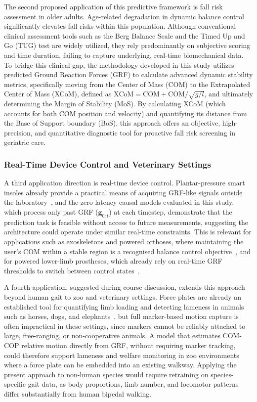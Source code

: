 \documentclass[preprint,12pt]{elsarticle}
\begin{document}
The second proposed application of this predictive framework is fall risk
assessment in older adults.
Age-related degradation in dynamic balance control significantly elevates fall
risks within this population.
Although conventional clinical assessment tools such as the Berg Balance Scale
and the Timed Up and Go (TUG) test are widely utilized, they rely predominantly
on subjective scoring and time duration, failing to capture underlying, real-time
biomechanical data.
To bridge this clinical gap, the methodology developed in this study utilizes
predicted Ground Reaction Forces (GRF) to calculate advanced dynamic stability
metrics, specifically moving from the Center of Mass (COM) to the Extrapolated
Center of Mass (XCoM), defined as $\mathrm{XCoM} = \mathrm{COM} + \dot{\mathrm{COM}} / \sqrt{g/l}$,
and ultimately determining the Margin of Stability (MoS).
By calculating XCoM (which accounts for both COM position and velocity) and
quantifying its distance from the Base of Support boundary (BoS), this approach
offers an objective, high-precision, and quantitative diagnostic tool for proactive
fall risk screening in geriatric care.

\subsubsection{Real-Time Device Control and Veterinary Settings}
\label{subsubsec:device}

A third application direction is real-time device control.
Plantar-pressure smart insoles already provide a practical means of acquiring
GRF-like signals outside the laboratory~\cite{s22249725}, and the zero-latency
causal models evaluated in this study, which process only past GRF
($\mathbf{g}_{0:t}$) at each timestep, demonstrate that the prediction task is
feasible without access to future measurements, suggesting the architecture could
operate under similar real-time constraints.
This is relevant for applications such as exoskeletons and powered orthoses, where
maintaining the user's COM within a stable region is a recognised balance control
objective~\cite{10.3389/fnbot.2021.751642}, and for powered lower-limb prostheses, which
already rely on real-time GRF thresholds to switch between control
states~\cite{10342504}.

A fourth application, suggested during course discussion, extends this approach
beyond human gait to zoo and veterinary settings.
Force plates are already an established tool for quantifying limb loading and
detecting lameness in animals such as horses, dogs, and
elephants~\cite{veterinary2022}, but full marker-based motion capture is often
impractical in these settings, since markers cannot be reliably attached to large,
free-ranging, or non-cooperative animals.
A model that estimates COM-COP relative motion directly from GRF, without
requiring marker tracking, could therefore support lameness and welfare monitoring
in zoo environments where a force plate can be embedded into an existing walkway.
Applying the present approach to non-human species would require retraining on
species-specific gait data, as body proportions, limb number, and locomotor
patterns differ substantially from human bipedal walking.
\end{document}
